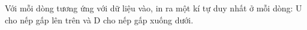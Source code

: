 Với mỗi dòng tương ứng với dữ liệu vào, in ra một kí tự duy nhất ở mỗi dòng: U cho nếp gấp lên trên và D cho nếp gấp xuống dưới.